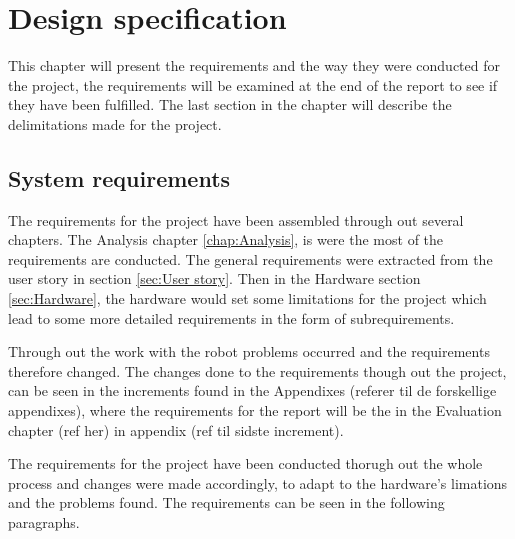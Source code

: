 \chapter{Design specification}
\label{chap:Design specification}
This chapter will present the requirements and the way they were conducted for the project, the requirements will be examined at the end of the report to see if they have been fulfilled. The last section in the chapter will describe the delimitations made for the project.

\section{System requirements}
\label{sec:System requirements}
The requirements for the project have been assembled through out several chapters. The Analysis chapter \ref{chap:Analysis}, is were the most of the requirements are conducted. The general requirements were extracted from the user story in section \ref{sec:User story}. Then in the Hardware section \ref{sec:Hardware}, the hardware would set some limitations for the project which lead to some more detailed requirements in the form of subrequirements.

Through out the work with the robot problems occurred and the requirements therefore changed. The changes done to the requirements though out the project, can be seen in the increments found in the Appendixes (referer til de forskellige appendixes), where the requirements for the report will be the in the Evaluation chapter (ref her) in appendix (ref til sidste increment).

The requirements for the project have been conducted thorugh out the whole process and changes were made accordingly, to adapt to the hardware's limations and the problems found. The requirements can be seen in the following paragraphs. 

